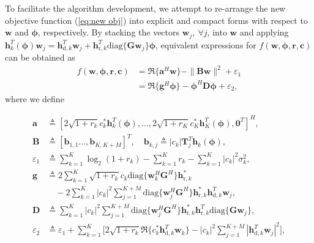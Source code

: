 \documentclass[Conference,a4paper]{IEEEtran}
\newcommand{\non}{\nonumber}
\begin{document}
To facilitate the algorithm development, we attempt to re-arrange the new objective function (\ref{eq:new obj}) into explicit and compact forms with respect to $\mathbf{w}$ and $\bm{\phi}$, respectively.
By stacking the vectors $\mathbf{w}_j,~\forall j$, into $\mathbf{w}$ and applying $\mathbf{h}^T_k(\bm{\phi})\mathbf{w}_j = \mathbf{h}_{\text{d},k}^T\mathbf{w}_j + \mathbf{h}_{\text{r},k}^T\text{diag}\{\mathbf{G}\mathbf{w}_j\}\bm{\phi}$, equivalent expressions for $f(\mathbf{w},\bm{\phi},\mathbf{r},\mathbf{c})$ can be obtained as
\begin{subequations}\begin{align}
f(\mathbf{w},\bm{\phi},\mathbf{r},\mathbf{c}) &= \Re\{\mathbf{a}^H\mathbf{w}\}-\|\mathbf{B}\mathbf{w}\|^2 + \varepsilon_1\\
& = \Re\{\mathbf{g}^H\bm{\phi}\} - \bm{\phi}^H\mathbf{D}\bm{\phi} + \varepsilon_2,
\end{align}\end{subequations}
where we define
\begin{small}\begin{align}
\mathbf{a} &\triangleq [2\sqrt{1\!+\!r_k}c_k^*\mathbf{h}^T_k(\bm{\phi}),\ldots,
2\sqrt{1\!+\!r_K}c_K^*\mathbf{h}^T_K(\bm{\phi}),\mathbf{0}^T]^H,\non\\
\mathbf{B} &\triangleq [\mathbf{b}_{1,1} \ldots, \mathbf{b}_{K,K+M}]^T,\quad
\mathbf{b}_{k,j} \triangleq |c_k|\mathbf{T}_j^T\mathbf{h}_k(\bm{\phi}),\non\\
\varepsilon_1 &\triangleq \sum_{k=1}^K\log_2(1+r_k) - \sum_{k=1}^K r_k-\sum_{k=1}^K|c_k|^2\sigma_k^2,\non\\
\mathbf{g} &\triangleq 2\sum_{k=1}^K\sqrt{1+r_k}c_k\text{diag}\{\mathbf{w}_k^H\mathbf{G}^H\}\mathbf{h}_{\text{r},k}^* \non\\
&\quad - 2\sum_{k=1}^K|c_k|^2\sum_{j=1}^{K+M}\text{diag}\{\mathbf{w}_j^H\mathbf{G}^H\}\mathbf{h}_{\text{r},k}^*\mathbf{h}^T_{\text{d},k}\mathbf{w}_j,\non\\
\mathbf{D} &\triangleq \sum_{k=1}^K\!|c_k|^2\!\sum_{j=1}^{K+M}\text{diag}\{\mathbf{w}_j^H\mathbf{G}^H\}
\mathbf{h}_{\text{r},k}^*\mathbf{h}^T_{\text{r},k}\text{diag}\{\mathbf{G}\mathbf{w}_j\},\non\\
\varepsilon_2 &\triangleq \varepsilon_1 \!+\! \sum_{k=1}^K\!\big[2\sqrt{1\!+\!r_k}\Re\{c_k^*\mathbf{h}^T_{\text{d},k}\mathbf{w}_k\}\!-\!  |c_k|^2\!\!\sum_{j=1}^{K+M}\!\!|\mathbf{h}^T_{\text{d},k}\mathbf{w}_j|^2\big],\non
\end{align}\end{small}
\vspace{-0.2 cm}
\end{document}
